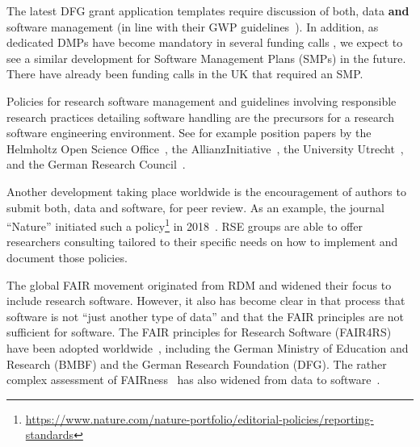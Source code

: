 \documentclass[a4paper]{article}
\begin{document}
The latest DFG grant application templates require discussion of both, data \textbf{and} software management (in line with their GWP guidelines~\autocite{dfg_gsp}).
In addition, as dedicated DMPs have become mandatory in several funding calls , we expect to see a similar development for Software Management Plans (SMPs) in the future.  There have already been funding calls in the UK that required an SMP.

Policies for research software management and guidelines involving responsible research practices detailing software handling are the precursors for a research software engineering environment.
See for example position papers by the Helmholtz Open Science Office~\autocite{Helmholtz2019a,Helmholtz2019b},
the AllianzInitiative~\autocite{Konrad2021},
the University Utrecht~\autocite{Utrecht2016b},
and the German Research Council~\autocite{dfg_gsp}.

Another development taking place worldwide is the encouragement of authors to submit both, data and software, for peer review.
As an example, the journal “Nature” initiated such a policy\footnote{\url{https://www.nature.com/nature-portfolio/editorial-policies/reporting-standards}} in 2018~\autocite{Nature2018}.
RSE groups are able to offer researchers consulting tailored to their specific needs on how to implement and document those policies.

The global FAIR movement originated from RDM and widened their focus to include research software.
However, it also has become clear in that process that software is not “just another type of data” and that the FAIR principles are not sufficient for software.
The FAIR principles for Research Software (FAIR4RS)~\autocite{ChueHong2022} have been adopted worldwide~\autocite{Barker2024}, including the German Ministry of Education and Research (BMBF) and the German Research Foundation (DFG).
The rather complex assessment of FAIRness~\autocite{Wilkinson2023,FAIRmaturity} has also widened from data to software~\autocite{Lamprecht2020}.
\end{document}
